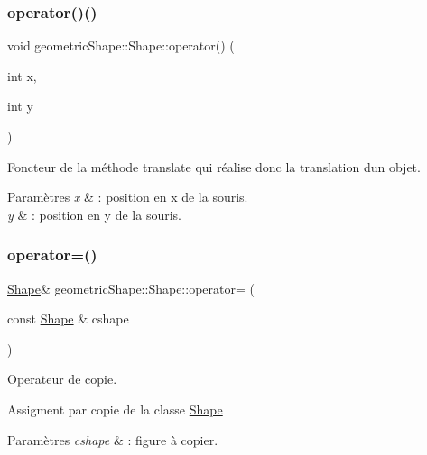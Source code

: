 \subsubsection{\texorpdfstring{operator()()}{operator()()}}
{\footnotesize\ttfamily void geometric\+Shape\+::\+Shape\+::operator() (\begin{DoxyParamCaption}\item[{int}]{x,  }\item[{int}]{y }\end{DoxyParamCaption})\hspace{0.3cm}{\ttfamily [protected]}}



Foncteur de la méthode translate qui réalise donc la translation d\textquotesingle{}un objet. 


\begin{DoxyParams}{Paramètres}
{\em x} & \+: position en x de la souris. \\
\hline
{\em y} & \+: position en y de la souris. \\
\hline
\end{DoxyParams}
\mbox{\label{classgeometric_shape_1_1_shape_aef5e79f1181e8284aca3323c56135cd6}} 
\subsubsection{\texorpdfstring{operator=()}{operator=()}}
{\footnotesize\ttfamily \hyperlink{classgeometric_shape_1_1_shape}{Shape}\& geometric\+Shape\+::\+Shape\+::operator= (\begin{DoxyParamCaption}\item[{const \hyperlink{classgeometric_shape_1_1_shape}{Shape} \&}]{cshape }\end{DoxyParamCaption})}



Operateur de copie. 

Assigment par copie de la classe \hyperlink{classgeometric_shape_1_1_shape}{Shape} 
\begin{DoxyParams}{Paramètres}
{\em cshape} & \+: figure à copier. \\
\hline
\end{DoxyParams}
\mbox{\label{classgeometric_shape_1_1_shape_a20194d8e1bd7a66d64e7874341498a72}} 
